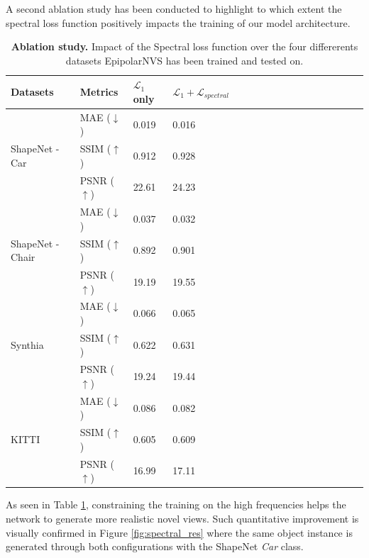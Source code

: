 A second ablation study has been conducted to highlight to which extent the spectral loss function positively impacts the training of our model architecture. 
\begin{table}[h!]
    \caption{\textbf{Ablation study.} Impact of the Spectral loss function over the four differerents datasets EpipolarNVS has been trained and tested on.}
    \label{tab:spectral}
\begin{center}
\begin{tabular}{@{}||lllllllllllllllll@{}}
  \toprule
  Datasets & Metrics  &$\mathcal{L}_{1}$ only  &  $\mathcal{L}_{1}+\mathcal{L}_{spectral}$ &   \\
  \midrule
  \multirow{3}{*}{ShapeNet - Car \citep{chang2015shapenet}} & MAE ($\downarrow$) &\hfil 0.019 & \hfil  \cellcolor{red!25}0.016 \\
  & SSIM ($\uparrow$) & \hfil0.912 & \hfil \cellcolor{red!25}0.928\\
  & PSNR ($\uparrow$)& \hfil22.61 & \hfil \cellcolor{red!25}24.23\\
  \midrule
  \multirow{3}{*}{ShapeNet - Chair \citep{chang2015shapenet}} & MAE ($\downarrow$) & \hfil 0.037 & \hfil \cellcolor{red!25}0.032\\
  & SSIM ($\uparrow$)&\hfil 0.892 & \hfil \cellcolor{red!25}0.901 \\
  & PSNR ($\uparrow$) & \hfil 19.19 & \hfil \cellcolor{red!25}19.55 \\
  \midrule
  \multirow{3}{*}{Synthia \citep{ros2016synthia}} & MAE ($\downarrow$)& \hfil 0.066 & \hfil \cellcolor{red!25}0.065\\
  & SSIM ($\uparrow$)& \hfil 0.622 & \hfil \cellcolor{red!25}0.631 \\
  & PSNR ($\uparrow$)& \hfil 19.24 & \hfil \cellcolor{red!25}19.44\\
  \midrule
  \multirow{3}{*}{KITTI \citep{geiger2012we}} & MAE ($\downarrow$)& \hfil 0.086 & \hfil \cellcolor{red!25}0.082\\
  & SSIM ($\uparrow$)& \hfil 0.605 & \hfil \cellcolor{red!25}0.609 \\
  & PSNR ($\uparrow$)& \hfil 16.99 & \hfil \cellcolor{red!25}17.11\\\hline

\end{tabular}
\end{center}
\end{table}

As seen in Table \ref{tab:spectral}, constraining the training on the high frequencies helps the network to generate more realistic novel views. Such quantitative improvement is visually confirmed in Figure \ref{fig:spectral_res} where the same object instance is generated through both configurations with the ShapeNet \textit{Car} class.\newline 

